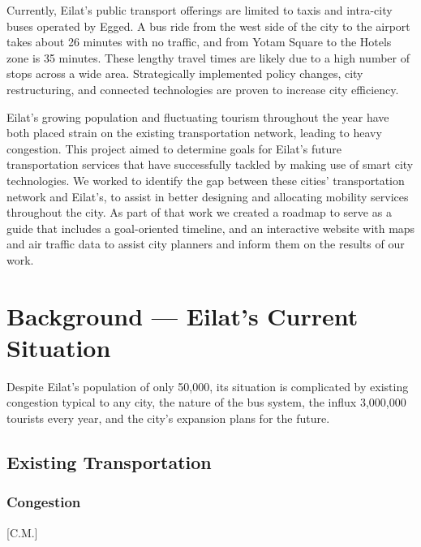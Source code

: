 \documentclass[12pt]{article}                       %
\begin{document}
Currently, Eilat's public transport offerings are limited to taxis and intra-city buses operated by Egged. A bus ride from the west side of the city to the airport takes about 26 minutes with no traffic, and from Yotam Square to the Hotels zone is 35 minutes. These lengthy travel times are likely due to a high number of stops across a wide area. Strategically implemented policy changes, city restructuring, and connected technologies are proven to increase city efficiency.

Eilat's growing population and fluctuating tourism throughout the year have both placed strain on the existing transportation network, leading to heavy congestion. This project aimed to determine goals for Eilat's future transportation services that have successfully tackled by making use of smart city technologies. We worked to identify the gap between these cities' transportation network and Eilat's, to assist in better designing and allocating mobility services throughout the city. As part of that work we created a roadmap to serve as a guide that includes a goal-oriented timeline, and an interactive website with maps and air traffic data to assist city planners and inform them on the results of our work.
 
\newpage
\section{Background --- Eilat's Current Situation }
Despite Eilat's population of only 50,000, its situation is complicated by existing congestion typical to any city, the nature of the bus system, the influx 3,000,000 tourists every year, and the city's expansion plans for the future.

\subsection{Existing Transportation}
\subsubsection{Congestion}[C.M.]
\end{document}
